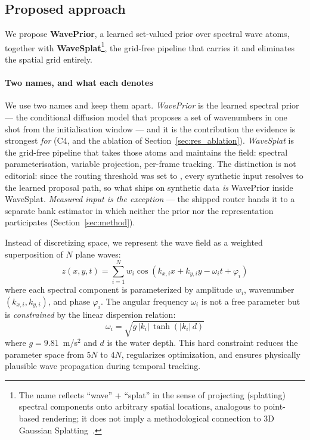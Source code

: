 \documentclass[review]{elsarticle}
\begin{document}
\subsection{Proposed approach}

We propose \textbf{WavePrior}, a learned set-valued prior over spectral wave
atoms, together with \textbf{WaveSplat}\footnote{The name reflects ``wave'' +
``splat'' in the sense of projecting (splatting) spectral components
onto arbitrary spatial locations, analogous to point-based rendering;
it does not imply a methodological connection to 3D Gaussian
Splatting~\citep{kerbl2023}.}, the grid-free pipeline that carries it and
eliminates the spatial grid entirely.

\paragraph{Two names, and what each denotes}
We use two names and keep them apart. \emph{WavePrior} is the learned spectral prior
--- the conditional diffusion model that proposes a set of wavenumbers in one shot
from the initialisation window --- and it is the contribution the evidence is
strongest \emph{for} (C4, and the ablation of
Section~\ref{sec:res_ablation}).
\emph{WaveSplat} is the grid-free pipeline that
takes those atoms and maintains the field: spectral parameterisation, variable
projection, per-frame tracking. The distinction is not editorial: since the routing
threshold was set to \DepAutoThresh{}, every synthetic input resolves to the learned
proposal path, so what ships on synthetic data \emph{is} WavePrior inside WaveSplat.
\emph{Measured input is the exception} --- the shipped router hands it to a separate
bank estimator in which neither the prior nor the representation participates
(Section~\ref{sec:method}).

Instead of discretizing space, we represent the wave field as a weighted
superposition of $N$ plane waves:
\begin{equation}
  z(x, y, t) = \sum_{i=1}^{N} w_i \cos(k_{x,i} x + k_{y,i} y - \omega_i t + \varphi_i)
  \label{eq:forward}
\end{equation}
where each spectral component is parameterized by amplitude $w_i$,
wavenumber $(k_{x,i}, k_{y,i})$, and phase $\varphi_i$.
The angular frequency $\omega_i$ is not a free parameter but is
\emph{constrained} by the linear dispersion relation:
\begin{equation}
  \omega_i = \sqrt{g \, |k_i| \, \tanh(|k_i| \, d)}
  \label{eq:dispersion}
\end{equation}
where $g = 9.81$~m/s$^2$ and $d$ is the water depth.
This hard constraint reduces the parameter space from $5N$ to $4N$,
regularizes optimization, and ensures physically plausible wave
propagation during temporal tracking.
\end{document}
